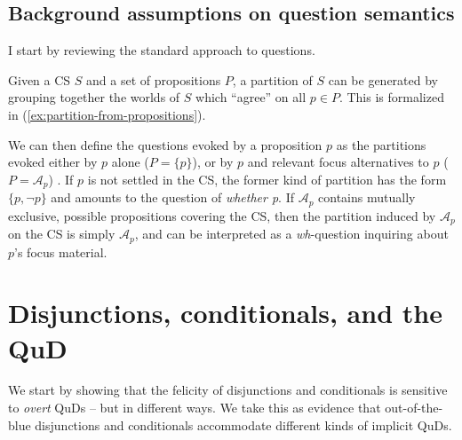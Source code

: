 \subsection{Background assumptions on question semantics}
I start by reviewing the standard approach to questions. 

Given a CS $S$ and a set of propositions $P$, a partition of $S$ can be generated by grouping together the worlds of $S$ which ``agree'' on all $p \in P$. This is formalized in (\ref{ex:partition-from-propositions}).

\begin{exe}
	\label{ex:partition-from-propositions}
\end{exe}


We can then define the questions evoked by a proposition $p$ as the partitions evoked either by $p$ alone ($P=\lbrace p \rbrace$), or by $p$ and relevant focus alternatives to $p$ ($P=\mathcal{A}_p$) \citep{Rooth1992}. If $p$ is not settled in the CS, the former kind of partition has the form $\lbrace p, \neg p\rbrace$ and amounts to the question of \textit{whether p}. If $\mathcal{A}_p$ contains mutually exclusive, possible propositions covering the CS, then the partition induced by $\mathcal{A}_p$ on the CS is simply $\mathcal{A}_p$, and can be interpreted as a \textit{wh}-question inquiring about $p$'s focus material.

\section{Disjunctions, conditionals, and the QuD}
We start by showing that the felicity of disjunctions and conditionals is sensitive to \textit{overt} QuDs -- but in different ways. We take this as evidence that out-of-the-blue disjunctions and conditionals accommodate different kinds of implicit QuDs.\\

